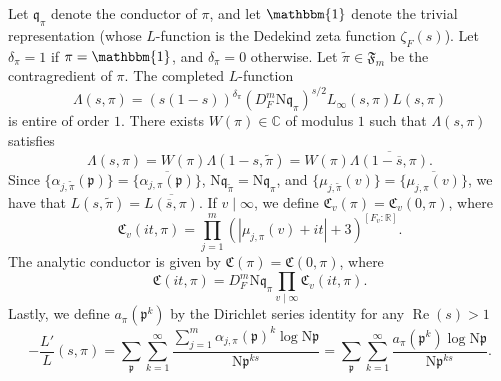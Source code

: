 \documentclass[12pt,reqno]{amsart}
\renewcommand{\tilde}{\widetilde}
\theoremstyle{remark}
\renewcommand{\tilde}{\widetilde}
\DeclareMathOperator{\Real}{Re}
\renewcommand{\tilde}{\widetilde}
\renewcommand{\bar}{\overline}
\renewcommand{\Re}{\mathrm{Re}}
\newcommand{\N}{\mathrm{N}}
\newcommand{\CC}{\mathbb{C}}
\newcommand{\R}{\mathbb{R}}
\newcommand{\kp}{\mathfrak{p}}
\newcommand{\kq}{\mathfrak{q}}
\numberwithin{equation}{section}
\begin{document}
   Let $\kq_{\pi}$ denote the conductor of $\pi$, and let $\mathbbm{1}$ denote the trivial representation (whose $L$-function is the Dedekind zeta function $\zeta_F(s)$). Let $\delta_{\pi}=1$ if $\pi=\mathbbm{1}$, and $\delta_{\pi}=0$ otherwise. Let $\tilde{\pi} \in \mathfrak{F}_m$  be the contragredient of $\pi$. The completed $L$-function
\[
\Lambda(s,\pi)=(s(1-s))^{\delta_{\pi}}(D_F^m\N\kq_{\pi})^{s/2}L_{\infty}(s,\pi)L(s,\pi)
\]
is entire of order $1$. 
There exists $W(\pi)\in\CC$ of modulus $1$ such that $\Lambda(s,\pi)$ satisfies 
\[
\Lambda(s,\pi)=W(\pi)\Lambda(1-s,\tilde\pi)=W(\pi)\overline{\Lambda(1-\bar{s},\pi)}.
\]
Since $\{\alpha_{j,\tilde{\pi}}(\kp)\} = \{\overline{\alpha_{j,\pi}(\kp)}\}$, $\N\kq_{\tilde{\pi}}=\N\kq_{\pi}$, and $\{\mu_{j,\tilde{\pi}}(v)\} = \{\overline{\mu_{j,\pi}(v)}\}$, we have that $L(s,\tilde{\pi}) = \overline{L(\overline{s},\pi)}$. If $v \mid \infty$, we define $\mathfrak{C}_v(\pi) = \mathfrak{C}_v(0,\pi)$, where 
\[
\mathfrak{C}_v(it,\pi) = \prod_{j=1}^m (|\mu_{j,\pi}(v)+it|+3)^{[F_v:\R]}.
\]
The analytic conductor is given by  $\mathfrak{C}(\pi)=\mathfrak{C}(0,\pi)$, where
\[
\mathfrak{C}(it,\pi)= D_F^m\N\kq_{\pi}\prod_{v\mid\infty} \mathfrak{C}_v(it,\pi).
\] 
Lastly, we define $a_{\pi}(\kp^k)$ by the Dirichlet series identity for any $\Real(s) > 1$
	\begin{equation}\label{eq:-L'/L}
	-\frac{L'}{L}(s,\pi) = \sum_{\kp}\sum_{k=1}^{\infty} \frac{\sum_{j=1}^{m} \alpha_{j, \pi}(\kp)^k\log \N\kp}{\N\kp^{ks}}= \sum_{\kp}\sum_{k=1}^{\infty} \frac{a_{\pi}(\kp^k)\log \N\kp}{\N\kp^{ks}}.
	\end{equation}






	
\end{document}
